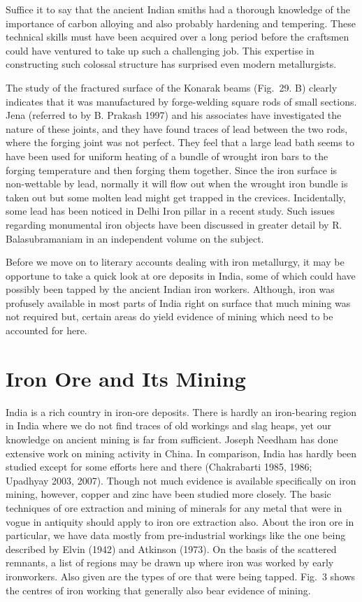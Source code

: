 Suffice it to say that the ancient Indian smiths had a thorough knowledge of the importance of carbon alloying and also probably hardening and tempering. These technical skills must have been acquired over a long period before the craftsmen could have ventured to take up such a challenging job. This expertise in constructing such colossal structure has surprised even modern metallurgists. 

The study of the fractured surface of the Konarak beams (Fig.~29. B) clearly indicates that it was manufactured by forge-welding square rods of small sections. Jena (referred to by B. Prakash 1997) and his associates have investigated the nature of these joints, and they have found traces of lead between the two rods, where the forging joint was not perfect. They feel that a large lead bath seems to have been used for uniform heating of a bundle of wrought iron bars to the forging temperature and then forging them together. Since the iron surface is non-wettable by lead, normally it will flow out when the wrought iron bundle is taken out but some molten lead might get trapped in the crevices. Incidentally, some lead has been noticed in Delhi Iron pillar in a recent study. Such issues regarding monumental iron objects have been discussed in greater detail by R. Balasubramaniam in an independent volume on the subject. 

Before we move on to literary accounts dealing with iron metallurgy, it may be opportune to take a quick look at ore deposits in India, some of which could have possibly been tapped by the ancient Indian iron workers. Although, iron was profusely available in most parts of India right on surface that much mining was not required but, certain areas do yield evidence of mining which need to be accounted for here.

\vspace{-.3cm}

\section*{Iron Ore and Its Mining}\label{chapter4-section-2}

India is a rich country in iron-ore deposits. There is hardly an iron-bearing region in India where we do not find traces of old workings and slag heaps, yet our knowledge on ancient mining is far from sufficient. Joseph Needham has done extensive work on mining activity in China. In comparison, India has hardly been studied except for some efforts here and there (Chakrabarti 1985, 1986; Upadhyay 2003, 2007). Though not much evidence is available specifically on iron mining, however, copper and zinc have been studied more closely. The basic techniques of ore extraction and mining of minerals for any metal that were in vogue in antiquity should apply to iron ore extraction also. About the iron ore in particular, we have data mostly from pre-industrial workings like the one being described by Elvin (1942) and Atkinson (1973). On the basis of the scattered remnants, a list of regions may be drawn up where iron was worked by early ironworkers. Also given are the types of ore that were being tapped. Fig.~3 shows the centres of iron working that generally also bear evidence of mining.

